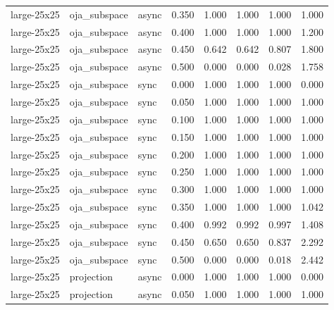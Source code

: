 \begin{tabular}{lllrrrrr}
large-25x25 & oja\_subspace & async & 0.350 & 1.000 & 1.000 & 1.000 & 1.000 \\

large-25x25 & oja\_subspace & async & 0.400 & 1.000 & 1.000 & 1.000 & 1.200 \\

large-25x25 & oja\_subspace & async & 0.450 & 0.642 & 0.642 & 0.807 & 1.800 \\

large-25x25 & oja\_subspace & async & 0.500 & 0.000 & 0.000 & 0.028 & 1.758 \\

large-25x25 & oja\_subspace & sync & 0.000 & 1.000 & 1.000 & 1.000 & 0.000 \\

large-25x25 & oja\_subspace & sync & 0.050 & 1.000 & 1.000 & 1.000 & 1.000 \\

large-25x25 & oja\_subspace & sync & 0.100 & 1.000 & 1.000 & 1.000 & 1.000 \\

large-25x25 & oja\_subspace & sync & 0.150 & 1.000 & 1.000 & 1.000 & 1.000 \\

large-25x25 & oja\_subspace & sync & 0.200 & 1.000 & 1.000 & 1.000 & 1.000 \\

large-25x25 & oja\_subspace & sync & 0.250 & 1.000 & 1.000 & 1.000 & 1.000 \\

large-25x25 & oja\_subspace & sync & 0.300 & 1.000 & 1.000 & 1.000 & 1.000 \\

large-25x25 & oja\_subspace & sync & 0.350 & 1.000 & 1.000 & 1.000 & 1.042 \\

large-25x25 & oja\_subspace & sync & 0.400 & 0.992 & 0.992 & 0.997 & 1.408 \\

large-25x25 & oja\_subspace & sync & 0.450 & 0.650 & 0.650 & 0.837 & 2.292 \\

large-25x25 & oja\_subspace & sync & 0.500 & 0.000 & 0.000 & 0.018 & 2.442 \\

large-25x25 & projection & async & 0.000 & 1.000 & 1.000 & 1.000 & 0.000 \\

large-25x25 & projection & async & 0.050 & 1.000 & 1.000 & 1.000 & 1.000 \\


\end{tabular}

